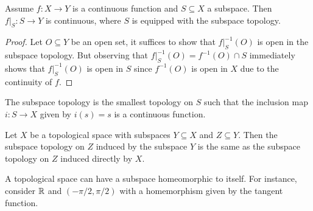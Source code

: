 \begin{theorem}
  Assume $f : X \to Y$ is a continuous function and
  $S \subseteq X$ a subspace. Then
  $f|_S : S \to Y$ is continuous, where
  $S$ is equipped with the subspace topology.
\end{theorem}

\begin{proof}
  Let $O \subseteq Y$ be an open set, it suffices
  to show that $f|_S^{-1}(O)$ is open in the subspace
  topology. But observing that
  $f|_S^{-1}(O) = f^{-1}(O) \cap S$
  immediately shows that $f|_S^{-1}(O)$ is open in $S$
  since $f^{-1}(O)$ is open in $X$ due to the
  continuity of $f$.
\end{proof}

\begin{remark}
  The subspace topology is the smallest topology
  on $S$ such that the inclusion map
  $i : S \to X$ given by
  $i(s) = s$ is a continuous function.
\end{remark}

\begin{remark}
  Let $X$ be a topological space with subspaces
  $Y \subseteq X$ and $Z \subseteq Y$. Then
  the subspace topology on $Z$ induced by the
  subspace $Y$ is the same as the
  subspace topology on $Z$ induced directly by $X$.
\end{remark}

\begin{remark}
  A topological space can have a subspace
  homeomorphic to itself. For instance, consider
  $\mathbb{R}$ and $(-\pi / 2, \pi / 2)$ with
  a homemorphism given by the tangent function.
\end{remark}
